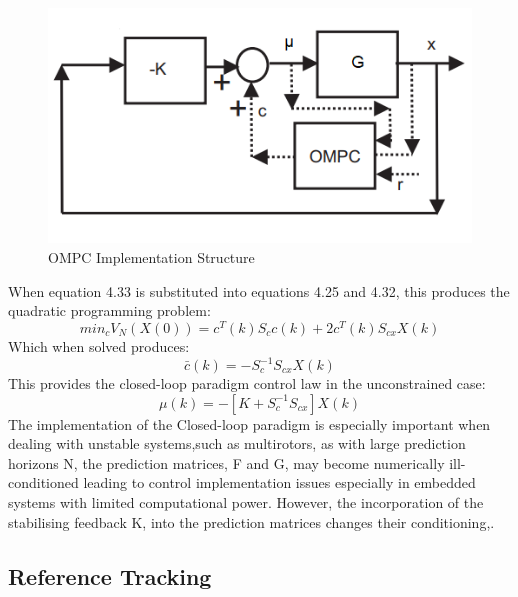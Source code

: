 \documentclass[12pt,a4paper,twoside]{report}
\begin{document}
				\begin{figure}[h!]
					\centering
					\includegraphics[width=0.8\linewidth]{OMPC.png}
					\caption{OMPC Implementation Structure}
					\label{fig:ompcimplementationstructure}
				\end{figure}
			
				When equation 4.33 is substituted into equations 4.25 and 4.32, this produces the quadratic programming problem:
				\begin{equation}
					min_c V_N(X(0)) = c^{T}(k) S_c c(k) + 2 c^{T}(k) S_{cx}X(k)
				\end{equation}
				Which when solved produces:
				\begin{equation}
					\bar{c}(k) = - S_c^{-1}S_{cx}X(k)
				\end{equation}
				This provides the closed-loop paradigm control law in the unconstrained case:
				\begin{equation}
					\mu(k) = - [K + S_c^{-1}S_{cx}]X(k)
				\end{equation}
				The implementation of the Closed-loop paradigm is especially important when dealing with unstable systems,such as multirotors, as with large prediction horizons N, the prediction matrices, F and G, may become numerically ill-conditioned leading to control implementation issues especially in embedded systems with limited computational power. However, the incorporation of the stabilising feedback K, into the prediction matrices changes their conditioning\cite{26},\cite{27}.
				
			\subsection{Reference Tracking}
				
\end{document}
